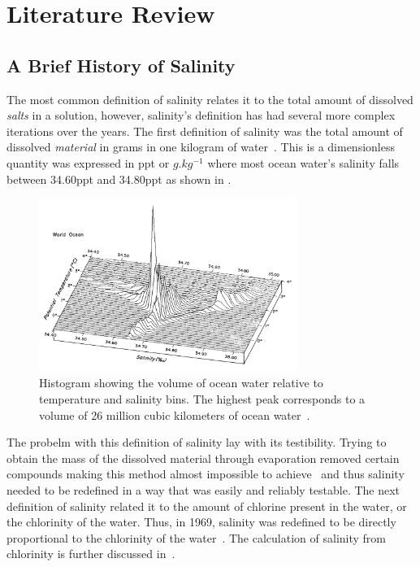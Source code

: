 
\chapter{Literature Review}\label{ch:literature}

\section{A Brief History of Salinity}\label{sec:salinity-and-its-properties}
The most common definition of salinity relates it to the total amount of dissolved \textit{salts} in a solution, however, salinity's definition has had several more complex iterations over the years.
The first definition of salinity was the total amount of dissolved \textit{material} in grams in one kilogram of water~\cite{stewart_introduction_to_physical_oceanography_2004}.
This is a dimensionless quantity was expressed in \acrfull{ppt} or $g.kg^{-1}$ where most ocean water's salinity falls between 34.60\acrshort{ppt} and 34.80\acrshort{ppt} as shown in .
\begin{figure}[h]
    \centering
    \includegraphics[width=0.75\textwidth]{Figures/ocean_salinity_temperature_quantity}
    \caption{Histogram showing the volume of ocean water relative to temperature and salinity bins. The highest peak corresponds to a volume of 26 million cubic kilometers of ocean water~\cite{worthington_ocean_graphs_1981}.}
    \label{fig:ocean_salinity_temperature_quantity} %
\end{figure}

The probelm with this definition of salinity lay with its testibility.
Trying to obtain the mass of the dissolved material through evaporation removed certain compounds making this method almost impossible to achieve~\cite{sverdrup_ocean_physics_and_chemistry_1942} and thus salinity needed to be redefined in a way that was easily and reliably testable.
The next definition of salinity related it to the amount of chlorine present in the water, or the chlorinity of the water.
Thus, in 1969, salinity was redefined to be directly proportional to the chlorinity of the water~\cite{stewart_introduction_to_physical_oceanography_2004}.
The calculation of salinity from chlorinity is further discussed in~.

